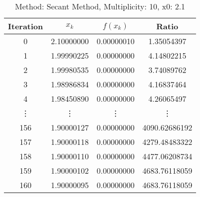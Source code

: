 \begin{table}
\centering
\caption{Method: Secant Method, Multiplicity: 10, x0: 2.1}
\label{tab:table_Secant_Method_10_2_1}
\begin{tabular}{c c c c}
\toprule
Iteration &      $x_k$ &   $f(x_k)$ &         Ratio \\
\midrule
        0 & 2.10000000 & 0.00000010 &    1.35054397 \\
        1 & 1.99990225 & 0.00000000 &    4.14802215 \\
        2 & 1.99980535 & 0.00000000 &    3.74089762 \\
        3 & 1.98986834 & 0.00000000 &    4.16837464 \\
        4 & 1.98450890 & 0.00000000 &    4.26065497 \\
   \vdots &     \vdots &     \vdots &        \vdots \\
      156 & 1.90000127 & 0.00000000 & 4090.62686192 \\
      157 & 1.90000118 & 0.00000000 & 4279.48483322 \\
      158 & 1.90000110 & 0.00000000 & 4477.06208734 \\
      159 & 1.90000102 & 0.00000000 & 4683.76118059 \\
      160 & 1.90000095 & 0.00000000 & 4683.76118059 \\
\bottomrule
\end{tabular}
\end{table}
